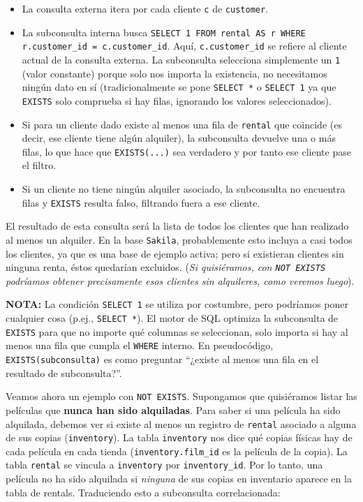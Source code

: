 \documentclass[12pt,a4paper]{article}
\begin{document}
\begin{itemize}
\item La consulta externa itera por cada cliente \texttt{c} de \texttt{customer}.
\item La subconsulta interna busca \texttt{SELECT 1 FROM rental AS r WHERE r.customer\_id = c.customer\_id}.
%
Aquí, \texttt{c.customer\_id} se refiere al cliente actual de la consulta externa.
%
La subconsulta selecciona simplemente un \texttt{1} (valor constante) porque solo nos importa la existencia, no necesitamos ningún dato en sí (tradicionalmente se pone \texttt{SELECT *} o \texttt{SELECT 1} ya que \texttt{EXISTS} solo comprueba si hay filas, ignorando los valores seleccionados).
\item Si para un cliente dado existe al menos una fila de \texttt{rental} que coincide (es decir, ese cliente tiene algún alquiler), la subconsulta devuelve una o más filas, lo que hace que \texttt{EXISTS(...)} sea verdadero y por tanto ese cliente pase el filtro.
\item Si un cliente no tiene ningún alquiler asociado, la subconsulta no encuentra filas y \texttt{EXISTS} resulta falso, filtrando fuera a ese cliente.
\end{itemize} El resultado de esta consulta será la lista de todos los clientes que han realizado al menos un alquiler.
%
En la base \texttt{Sakila}, probablemente esto incluya a casi todos los clientes, ya que es una base de ejemplo activa; pero si existieran clientes sin ninguna renta, éstos quedarían excluidos. (\textit{Si quisiéramos, con \texttt{NOT EXISTS} podríamos obtener precisamente esos clientes sin alquileres, como veremos luego}). 

\textbf{NOTA:} La condición \texttt{SELECT 1} se utiliza por costumbre, pero podríamos poner cualquier cosa (p.ej., \texttt{SELECT *}).
%
El motor de SQL optimiza la subconsulta de \texttt{EXISTS} para que no importe qué columnas se seleccionan, solo importa si hay al menos una fila que cumpla el \texttt{WHERE} interno.
%
En pseudocódigo, \texttt{EXISTS(subconsulta)} es como preguntar “¿existe al menos una fila en el resultado de subconsulta?”.


Veamos ahora un ejemplo con \texttt{NOT EXISTS}.
%
Supongamos que quisiéramos listar las películas que \textbf{nunca han sido alquiladas}.
%
Para saber si una película ha sido alquilada, debemos ver si existe al menos un registro de \texttt{rental} asociado a alguna de sus copias (\texttt{inventory}).
%
La tabla \texttt{inventory} nos dice qué copias físicas hay de cada película en cada tienda (\texttt{inventory.film\_id} es la película de la copia).
%
La tabla \texttt{rental} se vincula a \texttt{inventory} por \texttt{inventory\_id}.
%
Por lo tanto, una película no ha sido alquilada si \textit{ninguna} de sus copias en inventario aparece en la tabla de rentals.
%
Traduciendo esto a subconsulta correlacionada: 
\end{document}
